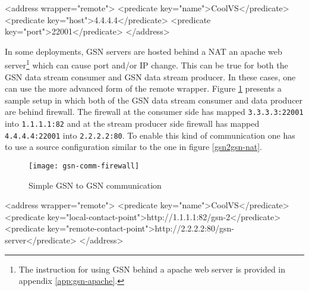 \begin{xmlcode}[caption={Source configuration for simple GSN to GSN communication.}, label=gsn2gsn-simple]
<address wrapper="remote">
  <predicate key="name">CoolVS</predicate>
  <predicate key="host">4.4.4.4</predicate>
  <predicate key="port">22001</predicate>
</address>        
\end{xmlcode}

In some deployments, GSN servers are hosted behind a NAT an apache web server\footnote{The instruction for using GSN behind a apache web server is provided in appendix \ref{app:gsn-apache}.} which can cause port and/or IP change. This can be true for both the GSN data stream consumer and GSN data stream producer.
In these cases, one can use the more advanced form of the remote wrapper. Figure \ref{gsn2gsn-nat-figure} presents a sample setup in which both of the GSN data stream
consumer and data producer are behind firewall. The firewall at the consumer side has mapped \texttt{3.3.3.3:22001} into \texttt{1.1.1.1:82} and at the stream producer side
firewall has mapped \texttt{4.4.4.4:22001} into \texttt{2.2.2.2:80}.  To enable this kind of
communication one has to use a source configuration similar to the one in figure \ref{gsn2gsn-nat}.


\begin{figure}%
  \centering
  \texttt{[image: gsn-comm-firewall]}
  \caption{Simple GSN to GSN communication}
  \label{gsn2gsn-nat-figure}
\end{figure}

\begin{xmlcode}[caption={Source configuration for NATed GSN to GSN communication.}, label=listing:xml:safestorage_vsd]
<address wrapper="remote">
  <predicate key="name">CoolVS</predicate>
  <predicate key="local-contact-point">http://1.1.1.1:82/gsn-2</predicate>
  <predicate key="remote-contact-point">http://2.2.2.2:80/gsn-server</predicate>
</address>        
\end{xmlcode}

